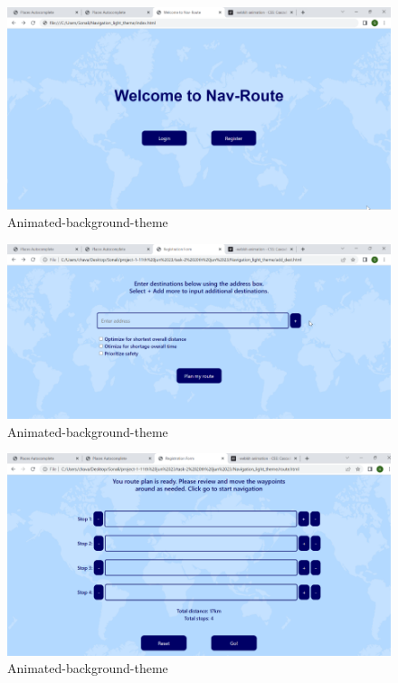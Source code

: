 \documentclass{article}
\begin{document}
\begin{figure}
  \centering
  \includegraphics[width=1\textwidth]{NithishFinal/Picture5.png}
  \caption{Animated-background-theme }
  \label{fig:example}
\end{figure}

\begin{figure}
  \centering
  \includegraphics[width=1\textwidth]{NithishFinal/Picture6.png}
  \caption{Animated-background-theme }
  \label{fig:example}
\end{figure}

\begin{figure}
  \centering
  \includegraphics[width=1\textwidth]{NithishFinal/Picture7.png}
  \caption{Animated-background-theme }
  \label{fig:example}
\end{figure}
\end{document}
